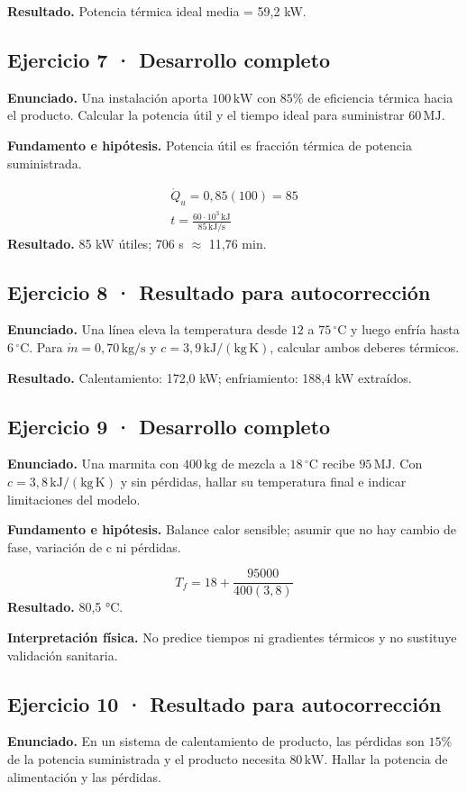\documentclass[11pt,a4paper]{article}
\begin{document}
\textbf{Resultado.} Potencia térmica ideal media = 59,2 kW.


\subsection*{Ejercicio 7 · Desarrollo completo}
\textbf{Enunciado.} Una instalación aporta \(100\,\mathrm{kW}\) con \(85\%\) de eficiencia térmica hacia el producto. Calcular la potencia útil y el tiempo ideal para suministrar \(60\,\mathrm{MJ}\).

\textbf{Fundamento e hipótesis.} Potencia útil es fracción térmica de potencia suministrada.

\[
\begin{gathered}
\dot Q_u=0{,}85(100)=85\\t=\frac{60\cdot10^3\,\mathrm{kJ}}{85\,\mathrm{kJ/s}}
\end{gathered}
\]
\textbf{Resultado.} 85 kW útiles; 706 s \ensuremath{\approx} 11,76 min.


\subsection*{Ejercicio 8 · Resultado para autocorrección}
\textbf{Enunciado.} Una línea eleva la temperatura desde \(12\) a \(75\,^\circ\mathrm C\) y luego enfría hasta \(6\,^\circ\mathrm C\). Para \(\dot m=0{,}70\,\mathrm{kg/s}\) y \(c=3{,}9\,\mathrm{kJ/(kg\,K)}\), calcular ambos deberes térmicos.

\textbf{Resultado.} Calentamiento: 172,0 kW; enfriamiento: 188,4 kW extraídos.


\subsection*{Ejercicio 9 · Desarrollo completo}
\textbf{Enunciado.} Una marmita con \(400\,\mathrm{kg}\) de mezcla a \(18\,^\circ\mathrm C\) recibe \(95\,\mathrm{MJ}\). Con \(c=3{,}8\,\mathrm{kJ/(kg\,K)}\) y sin pérdidas, hallar su temperatura final e indicar limitaciones del modelo.

\textbf{Fundamento e hipótesis.} Balance calor sensible; asumir que no hay cambio de fase, variación de c ni pérdidas.

\[
T_f=18+\frac{95000}{400(3{,}8)}
\]
\textbf{Resultado.} 80,5 °C.

\textbf{Interpretación física.} No predice tiempos ni gradientes térmicos y no sustituye validación sanitaria.


\subsection*{Ejercicio 10 · Resultado para autocorrección}
\textbf{Enunciado.} En un sistema de calentamiento de producto, las pérdidas son \(15\%\) de la potencia suministrada y el producto necesita \(80\,\mathrm{kW}\). Hallar la potencia de alimentación y las pérdidas.
\end{document}
